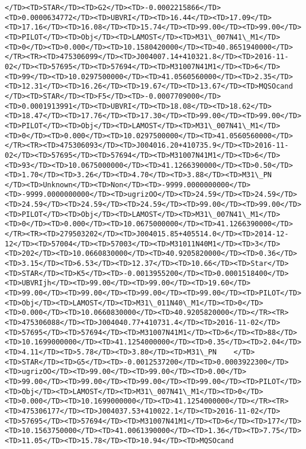 \documentclass[11pt]{article}
\begin{document}
\begin{Verbatim}[commandchars=\\\{\}]
</TD><TD>STAR</TD><TD>G2</TD><TD>-0.0002215866</TD><TD>0.0000634772</TD><TD>UBVRI</TD><TD>16.44</TD><TD>17.09</TD><TD>17.16</TD><TD>16.08</TD><TD>15.74</TD><TD>99.00</TD><TD>99.00</TD><TD>PILOT</TD><TD>Obj</TD><TD>LAMOST</TD><TD>M31\_007N41\_M1</TD><TD>0</TD><TD>0.000</TD><TD>10.1580420000</TD><TD>40.8651940000</TD></TR><TR><TD>475306099</TD><TD>J004007.14+410321.8</TD><TD>2016-11-02</TD><TD>57695</TD><TD>57694</TD><TD>M31007N41M1</TD><TD>6</TD><TD>99</TD><TD>10.0297500000</TD><TD>41.0560560000</TD><TD>2.35</TD><TD>12.31</TD><TD>16.26</TD><TD>19.67</TD><TD>13.67</TD><TD>MQSOcand  </TD><TD>STAR</TD><TD>F5</TD><TD>-0.0007709000</TD><TD>0.0001913991</TD><TD>UBVRI</TD><TD>18.08</TD><TD>18.62</TD><TD>18.47</TD><TD>17.76</TD><TD>17.30</TD><TD>99.00</TD><TD>99.00</TD><TD>PILOT</TD><TD>Obj</TD><TD>LAMOST</TD><TD>M31\_007N41\_M1</TD><TD>0</TD><TD>0.000</TD><TD>10.0297500000</TD><TD>41.0560560000</TD></TR><TR><TD>475306093</TD><TD>J004016.20+410735.9</TD><TD>2016-11-02</TD><TD>57695</TD><TD>57694</TD><TD>M31007N41M1</TD><TD>6</TD><TD>93</TD><TD>10.0675000000</TD><TD>41.1266390000</TD><TD>0.50</TD><TD>1.70</TD><TD>3.26</TD><TD>4.70</TD><TD>3.88</TD><TD>M31\_PN    </TD><TD>Unknown</TD><TD>Non</TD><TD>-9999.0000000000</TD><TD>-9999.0000000000</TD><TD>ugrizOO</TD><TD>24.59</TD><TD>24.59</TD><TD>24.59</TD><TD>24.59</TD><TD>24.59</TD><TD>99.00</TD><TD>99.00</TD><TD>PILOT</TD><TD>Obj</TD><TD>LAMOST</TD><TD>M31\_007N41\_M1</TD><TD>0</TD><TD>0.000</TD><TD>10.0675000000</TD><TD>41.1266390000</TD></TR><TR><TD>279503202</TD><TD>J004015.85+405514.0</TD><TD>2014-12-12</TD><TD>57004</TD><TD>57003</TD><TD>M31011N40M1</TD><TD>3</TD><TD>202</TD><TD>10.0660830000</TD><TD>40.9205820000</TD><TD>0.36</TD><TD>3.15</TD><TD>6.53</TD><TD>12.37</TD><TD>10.66</TD><TD>Star</TD><TD>STAR</TD><TD>K5</TD><TD>-0.0013955200</TD><TD>0.0001518400</TD><TD>UBVRIjh</TD><TD>99.00</TD><TD>99.00</TD><TD>19.60</TD><TD>99.00</TD><TD>99.00</TD><TD>99.00</TD><TD>99.00</TD><TD>PILOT</TD><TD>Obj</TD><TD>LAMOST</TD><TD>M31\_011N40\_M1</TD><TD>0</TD><TD>0.000</TD><TD>10.0660830000</TD><TD>40.9205820000</TD></TR><TR><TD>475306088</TD><TD>J004040.77+410731.4</TD><TD>2016-11-02</TD><TD>57695</TD><TD>57694</TD><TD>M31007N41M1</TD><TD>6</TD><TD>88</TD><TD>10.1699000000</TD><TD>41.1254000000</TD><TD>0.35</TD><TD>2.04</TD><TD>4.11</TD><TD>5.78</TD><TD>3.80</TD><TD>M31\_PN    </TD><TD>STAR</TD><TD>G5</TD><TD>-0.0012537200</TD><TD>0.0003922300</TD><TD>ugrizOO</TD><TD>99.00</TD><TD>99.00</TD><TD>0.00</TD><TD>99.00</TD><TD>99.00</TD><TD>99.00</TD><TD>99.00</TD><TD>PILOT</TD><TD>Obj</TD><TD>LAMOST</TD><TD>M31\_007N41\_M1</TD><TD>0</TD><TD>0.000</TD><TD>10.1699000000</TD><TD>41.1254000000</TD></TR><TR><TD>475306177</TD><TD>J004037.53+410022.1</TD><TD>2016-11-02</TD><TD>57695</TD><TD>57694</TD><TD>M31007N41M1</TD><TD>6</TD><TD>177</TD><TD>10.1563750000</TD><TD>41.0061390000</TD><TD>1.36</TD><TD>7.75</TD><TD>11.05</TD><TD>15.78</TD><TD>10.94</TD><TD>MQSOcand  
\end{Verbatim}
\end{document}
